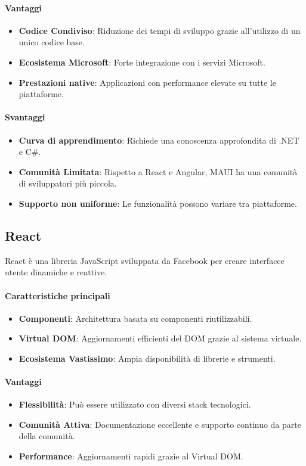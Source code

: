 \documentclass{article}
\begin{document}
\paragraph*{Vantaggi}
\begin{itemize}
    \item \textbf{Codice Condiviso}: Riduzione dei tempi di sviluppo grazie all'utilizzo di un unico codice base.
    \item \textbf{Ecosistema Microsoft}: Forte integrazione con i servizi Microsoft.
    \item \textbf{Prestazioni native}: Applicazioni con performance elevate su tutte le piattaforme.
\end{itemize}

\paragraph*{Svantaggi}
\begin{itemize}
    \item \textbf{Curva di apprendimento}: Richiede una conoscenza approfondita di .NET e C\#.
    \item \textbf{Comunit\`a Limitata}: Rispetto a React e Angular, MAUI ha una comunit\`a di sviluppatori pi\`u piccola.
    \item \textbf{Supporto non uniforme}: Le funzionalit\`a possono variare tra piattaforme.
\end{itemize}

\subsection{React}
React \`e una libreria JavaScript sviluppata da Facebook per creare interfacce utente dinamiche e reattive.

\paragraph*{Caratteristiche principali}
\begin{itemize}
    \item \textbf{Componenti}: Architettura basata su componenti riutilizzabili.
    \item \textbf{Virtual DOM}: Aggiornamenti efficienti del DOM grazie al sistema virtuale.
    \item \textbf{Ecosistema Vastissimo}: Ampia disponibilit\`a di librerie e strumenti.
\end{itemize}

\paragraph*{Vantaggi}
\begin{itemize}
    \item \textbf{Flessibilit\`a}: Pu\`o essere utilizzato con diversi stack tecnologici.
    \item \textbf{Comunit\`a Attiva}: Documentazione eccellente e supporto continuo da parte della comunit\`a.
    \item \textbf{Performance}: Aggiornamenti rapidi grazie al Virtual DOM.
\end{itemize}
\end{document}
